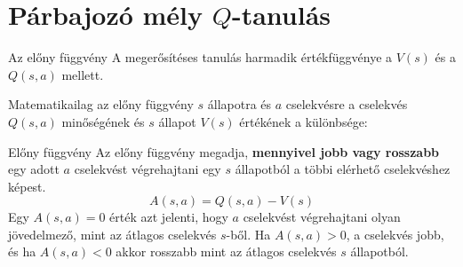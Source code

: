 \documentclass[english, aspectratio=169]{beamer}
\makeatletter
\let\origtableofcontents=\tableofcontents
\def\tableofcontents{\@ifnextchar[{\origtableofcontents}{\gobbletableofcontents}}
\def\gobbletableofcontents#1{\origtableofcontents}
\makeatother
\begin{document}
\section{Párbajozó mély $Q$-tanulás}

\begin{frame}
\tableofcontents[currentsection]
\end{frame}

\begin{frame}{Az előny függvény}
A megerősítéses tanulás harmadik értékfüggvénye a $V(s)$ és a $Q(s,a)$ mellett.\par\smallskip
Matematikailag az előny függvény $s$ állapotra és $a$ cselekvésre a cselekvés $Q(s,a)$ minőségének és $s$ állapot $V(s)$ értékének a különbsége:
\begin{block}{Előny függvény}
Az előny függvény megadja, \textbf{mennyivel jobb vagy rosszabb} egy adott $a$ cselekvést végrehajtani egy $s$ állapotból a többi elérhető cselekvéshez képest.
\[
A(s,a) = Q(s,a) - V(s)
\]
Egy $A(s,a)=0$ érték azt jelenti, hogy $a$ cselekvést végrehajtani olyan jövedelmező, mint az átlagos cselekvés $s$-ből. Ha $A(s,a)>0$, a cselekvés jobb, és ha $A(s,a)<0$ akkor rosszabb mint az átlagos cselekvés $s$ állapotból.
\end{block}
\end{frame}
\end{document}
